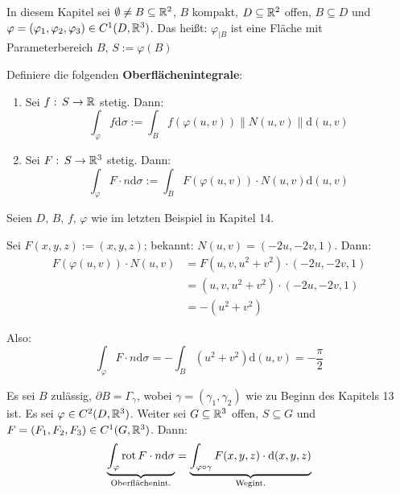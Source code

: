 In diesem Kapitel sei \(\emptyset\neq B\subseteq\mathbb{R}^{2}\), \(B\)
kompakt, \(D\subseteq\mathbb{R}^{2}\) offen, \(B\subseteq D\)
und \(\varphi=(\varphi_{1},\varphi_{2},\varphi_{3})\in C^{1}(D,\mathbb{R}^{3})\). Das heißt: \(\varphi_{|B}\) ist eine Fläche mit
Parameterbereich \(B\), \(S:=\varphi(B)\)

\begin{definition}
Definiere die folgenden \textbf{Oberflächenintegrale}:
\begin{enumerate}
\item Sei \(f:\,S\to\mathbb{R}\) stetig. Dann:
\[
\int_{\varphi}{f\mathrm{d}\sigma}:=\int_{B}{f(\varphi(u,v))\lVert N(u,v)\rVert\mathrm{d}(u,v)}
\]
\item Sei \(F:\,S\to\mathbb{R}^{3}\) stetig. Dann:
\[
\int_{\varphi}{F\cdot n\mathrm{d}\sigma}:=\int_{B}{F(\varphi(u,v))\cdot N(u,v)\mathrm{d}(u,v)}
\]
\end{enumerate}
\end{definition}

\begin{beispiel}
Seien \(D,\,B,\,f,\,\varphi\) wie im letzten Beispiel in Kapitel 14.

Sei \(F(x,y,z):=(x,y,z)\); bekannt: \(N(u,v)=(-2u,-2v,1)\). Dann:
\begin{align*}
F(\varphi(u,v))\cdot N(u,v)&=F(u,v,u^{2}+v^{2})\cdot(-2u,-2v,1)\\
&=(u,v,u^{2}+v^{2})\cdot (-2u,-2v,1)\\
&=-(u^{2}+v^{2})
\end{align*}

Also:
\[
\int_{\varphi}{F\cdot n\mathrm{d}\sigma}=-\int_{B}{(u^{2}+v^{2})\mathrm{d}(u,v)}=-\frac{\pi}{2}
\]
\end{beispiel}

\begin{satz}
\label{Satz 15.1}
Es sei \(B\) zulässig, \(\partial B=\Gamma_{\gamma}\), wobei \(\gamma=(\gamma_{1},\gamma_{2})\) wie zu Beginn des Kapitels
13 ist. Es sei \(\varphi\in C^{2}(D,\mathbb{R}^{3})\). Weiter sei \(G\subseteq\mathbb{R}^{3}\) offen, \(S\subseteq G\) und \(F=(F_{1},F_{2},F_{3})\in C^{1}(G,\mathbb{R}^{3})\). Dann:
\[
\underbrace{\int_{\varphi}{\mathop{\rm rot}\nolimits F\cdot n\mathrm{d}\sigma}}_{\text{Oberflächenint.}}=
    \underbrace{\int_{\varphi\circ\gamma}{F(x,y,z)\cdot\mathrm{d}(x,y,z)}}_{\text{Wegint.}}
\]
\end{satz}

